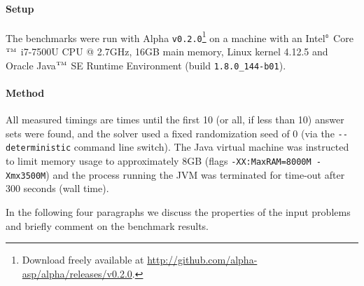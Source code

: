 \documentclass{vutinfth} %
\begin{document}
\paragraph{Setup} The benchmarks were run with Alpha \texttt{v0.2.0}\footnote{Download freely available at \url{http://github.com/alpha-asp/alpha/releases/v0.2.0}.} on a machine with an Intel$^{\text{\tiny{\textregistered}}}$ Core$^{\text{\tiny{TM}}}$ i7-7500U CPU @ 2.7GHz, 16GB main memory, Linux kernel 4.12.5 and Oracle Java$^{\text{\tiny{TM}}}$ SE Runtime Environment (build \texttt{1.8.0\_144-b01}).

\paragraph{Method} All measured timings are times until the first 10 (or all, if less than 10) answer sets were found, and the solver used a fixed randomization seed of 0 (via the \texttt{-{}-deterministic} command line switch). The Java virtual machine was instructed to limit memory usage to approximately 8GB (flags \texttt{-XX:MaxRAM=8000M -Xmx3500M}) and the process running the JVM was terminated for time-out after 300 seconds (wall time).

In the following four paragraphs we discuss the properties of the input problems and briefly comment on the benchmark results.
\end{document}
